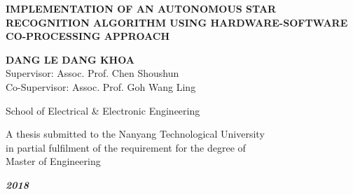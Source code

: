 \documentclass[dvips,a4paper,12pt]{report}
\begin{document}
	\newpage
	\thispagestyle{empty}
	\begin{center}
		\vspace{4.0cm}

		\renewcommand{\baselinestretch}{1.0}%
			\textbf{\Large \MakeUppercase{IMPLEMENTATION OF AN AUTONOMOUS STAR RECOGNITION ALGORITHM USING HARDWARE-SOFTWARE CO-PROCESSING APPROACH}}
		\renewcommand{\baselinestretch}{\spacing}%

		\vspace{1.0cm}

		\textbf{\MakeUppercase{DANG LE DANG KHOA}} \\
		Supervisor: Assoc. Prof. Chen Shoushun \\
		Co-Supervisor: Assoc. Prof. Goh Wang Ling

		\vspace{\fill}

		{School of Electrical \& Electronic Engineering}

		\vspace{1.0cm}

		A thesis submitted to the Nanyang Technological University \\
		in partial fulfilment of the requirement for the degree of \\
		Master of Engineering

		\vspace{1.0cm}
		
		{\textbf{\emph{2018}}}

	\end{center}

	\newpage
	\clearpage
	\setcounter{page}{1}
	
	
	
	
	
	

	
	
\end{document}
